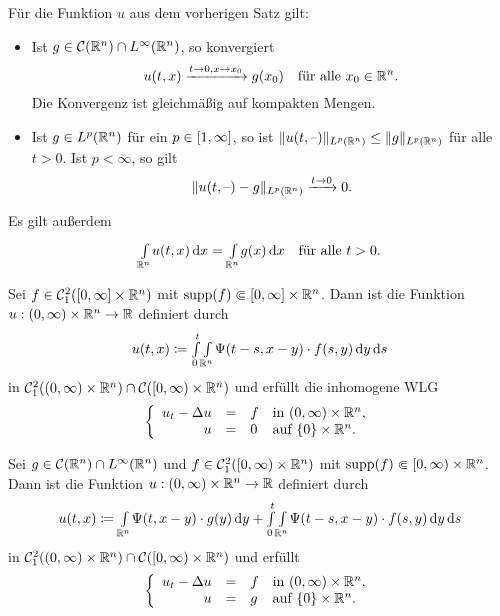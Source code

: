 \documentclass{cheat-sheet}
\begin{document}
\begin{satz}
  Für die Funktion $u$ aus dem vorherigen Satz gilt:
  \begin{itemize}
    \item Ist $g \in \mathcal{C}(\mathbb{R}^n) \cap L^\infty(\mathbb{R}^n)$, so konvergiert
    \[
      u(t, x) \xrightarrow{t \to 0, x \to x_0} g(x_0)
      \quad \text{für alle $x_0 \in \mathbb{R}^n$.}
    \]
    Die Konvergenz ist gleichmäßig auf kompakten Mengen.
    \item Ist $g \in L^p(\mathbb{R}^n)$ für ein $p \in \left[ 1, \infty \right]$, so ist $\lVert u(t, \text{--})\rVert_{L^p(\mathbb{R}^n)} \leq \lVert g\rVert_{L^p(\mathbb{R}^n)}$ für alle $t > 0$. Ist $p < \infty$, so gilt
    \[ \lVert u(t, \text{--}) - g\rVert_{L^p(\mathbb{R}^n)} \xrightarrow{t \to 0} 0. \]
  \end{itemize}
\end{satz}

\begin{prop}
  Es gilt außerdem
  \[
    {\textstyle \int\limits_{\mathbb{R}^n}^{}} u(t, x) \,\mathrm{d} x = {\textstyle \int\limits_{\mathbb{R}^n}^{}} g(x) \,\mathrm{d} x
    \quad \text{für alle $t > 0$.}
  \]
\end{prop}

\begin{satz}
  Sei $f \in \mathcal{C}_1^2(\left[ 0, \infty \right] \times \mathbb{R}^n)$ mit $\mathop{\mathrm{supp}}(f) \Subset \left[ 0, \infty \right] \times \mathbb{R}^n$. Dann ist die Funktion $u : \left( 0, \infty \right) \times \mathbb{R}^n \to \mathbb{R}$ definiert durch
  \[ u(t, x) \coloneqq {\textstyle \int\limits_{0}^{t}} {\textstyle \int\limits_{\mathbb{R}^n}^{}} \Psi(t-s,x-y) \cdot f(s,y) \,\mathrm{d} y \,\mathrm{d} s \]
  in $\mathcal{C}_1^2(\left( 0, \infty \right) \times \mathbb{R}^n) \cap \mathcal{C}(\left[ 0, \infty \right) \times \mathbb{R}^n)$ und erfüllt die inhomogene WLG
  \[
    \left\{ \begin{array}{rlll}
      u_t - \Delta u &=& f & \text{in $\left( 0, \infty \right) \times \mathbb{R}^n$},\\
      u &=& 0 & \text{auf $\{ 0 \} \times \mathbb{R}^n$}.
    \end{array} \right.
  \]
\end{satz}

\begin{satz}
  Sei $g \in \mathcal{C}(\mathbb{R}^n) \cap L^\infty(\mathbb{R}^n)$ und $f \in \mathcal{C}_1^2(\left[ 0, \infty \right) \times \mathbb{R}^n)$ mit $\mathop{\mathrm{supp}}(f) \Subset \left[ 0, \infty \right) \times \mathbb{R}^n$. Dann ist die Funktion $u : \left( 0, \infty \right) \times \mathbb{R}^n \to \mathbb{R}$ definiert durch
  \[
    u(t, x) \coloneqq {\textstyle \int\limits_{\mathbb{R}^n}^{}} \Psi(t, x-y) \cdot g(y) \,\mathrm{d} y + {\textstyle \int\limits_{0}^{t}} {\textstyle \int\limits_{\mathbb{R}^n}^{}} \Psi(t-s,x-y) \cdot f(s, y) \,\mathrm{d} y \,\mathrm{d} s
  \]
  in $\mathcal{C}_1^2(\left( 0, \infty \right) \times \mathbb{R}^n) \cap \mathcal{C}(\left[ 0, \infty \right) \times \mathbb{R}^n)$ und erfüllt
  \[
    \left\{ \begin{array}{rlll}
      u_t - \Delta u &=& f & \text{in $\left( 0, \infty \right) \times \mathbb{R}^n$},\\
      u &=& g & \text{auf $\{ 0 \} \times \mathbb{R}^n$}.
    \end{array} \right.
  \]
\end{satz}
\end{document}
